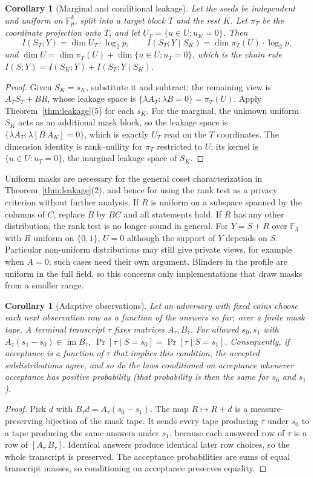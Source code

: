 \documentclass[pdflatex,sn-mathphys-num]{sn-jnl}
\theoremstyle{plain}
\newtheorem{corollary}[theorem]{Corollary}
\theoremstyle{definition}
\newcommand{\F}{\mathbb{F}}
\newcommand{\im}{\operatorname{im}}
\begin{document}
\begin{corollary}[Marginal and conditional leakage]\label{cor:condleak}
Let the seeds be independent and uniform on $\F_p^k$, split into a target block $T$ and the rest $K$. Let $\pi_T$ be the coordinate projection onto $T$, and let $U_{T}=\{u\in U:u_K=0\}$. Then
\[
 I(S_T;Y)=\dim U_T\cdot\log_2p,\qquad I(S_T;Y\mid S_K)=\dim\pi_T(U)\cdot\log_2p,
\]
and $\dim U=\dim\pi_T(U)+\dim\{u\in U:u_T=0\}$, which is the chain rule $I(S;Y)=I(S_K;Y)+I(S_T;Y\mid S_K)$.
\end{corollary}
\begin{proof}
Given $S_K=s_K$, substitute it and subtract; the remaining view is $A_TS_T+BR$, whose leakage space is $\{\lambda A_T:\lambda B=0\}=\pi_T(U)$. Apply Theorem~\ref{thm:leakage}(5) for each $s_K$. For the marginal, the unknown uniform $S_K$ acts as an additional mask block, so the leakage space is $\{\lambda A_T:\lambda[B\ A_K]=0\}$, which is exactly $U_T$ read on the $T$ coordinates. The dimension identity is rank--nullity for $\pi_T$ restricted to $U$; its kernel is $\{u\in U:u_T=0\}$, the marginal leakage space of $S_K$.
\end{proof}

Uniform masks are necessary for the general coset characterization in Theorem~\ref{thm:leakage}(2), and hence for using the rank test as a privacy criterion without further analysis. If $R$ is uniform on a subspace spanned by the columns of $C$, replace $B$ by $BC$ and all statements hold. If $R$ has any other distribution, the rank test is no longer sound in general. For $Y=S+R$ over $\F_3$ with $R$ uniform on $\{0,1\}$, $U=0$ although the support of $Y$ depends on $S$. Particular non-uniform distributions may still give private views, for example when $A=0$; such cases need their own argument. Blinders in the profile are uniform in the full field, so this concerns only implementations that draw masks from a smaller range.

\begin{corollary}[Adaptive observations]\label{cor:adaptive}
Let an adversary with fixed coins choose each next observation row as a function of the answers so far, over a finite mask tape. A terminal transcript $\tau$ fixes matrices $A_\tau,B_\tau$. For allowed $s_0,s_1$ with $A_\tau(s_1-s_0)\in\im B_\tau$, $\Pr[\tau\mid S=s_0]=\Pr[\tau\mid S=s_1]$. Consequently, if acceptance is a function of $\tau$ that implies this condition, the accepted subdistributions agree, and so do the laws conditioned on acceptance whenever acceptance has positive probability (that probability is then the same for $s_0$ and $s_1$).
\end{corollary}
\begin{proof}
Pick $d$ with $B_\tau d=A_\tau(s_0-s_1)$. The map $R\mapsto R+d$ is a measure-preserving bijection of the mask tape. It sends every tape producing $\tau$ under $s_0$ to a tape producing the same answers under $s_1$, because each answered row of $\tau$ is a row of $[A_\tau\ B_\tau]$. Identical answers produce identical later row choices, so the whole transcript is preserved. The acceptance probabilities are sums of equal transcript masses, so conditioning on acceptance preserves equality.
\end{proof}
\end{document}
